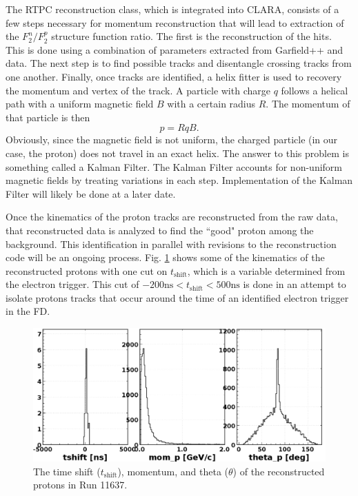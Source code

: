 The RTPC reconstruction class, which is integrated into CLARA, consists of a few steps necessary for momentum reconstruction that will lead to extraction of the $F_2^n/F_2^p$ structure function ratio. The first is the reconstruction of the hits. This is done using a combination of parameters extracted from Garfield++ and data. The next step is to find possible tracks and disentangle crossing tracks from one another. Finally, once tracks are identified, a helix fitter is used to recovery the momentum and vertex of the track. A particle with charge $q$ follows a helical path with a uniform magnetic field $B$ with a certain radius $R$. The momentum of that particle is then
\begin{equation}
p = RqB.
\end{equation}
Obviously, since the magnetic field is not uniform, the charged particle (in our case, the proton) does not travel in an exact helix. The answer to this problem is something called a Kalman Filter. The Kalman Filter accounts for non-uniform magnetic fields by treating variations in each step. Implementation of the Kalman Filter will likely be done at a later date.

Once the kinematics of the proton tracks are reconstructed from the raw data, that reconstructed data is analyzed to find the ``good" proton among the background. This identification in parallel with revisions to the reconstruction code will be an ongoing process. Fig. \ref{fig:rgf_pkin} shows some of the kinematics of the reconstructed protons with one cut on $t_{\mathrm{shift}}$, which is a variable determined from the electron trigger. This cut of $-200 \mathrm{ns} < t_{\mathrm{shift}} < 500 \mathrm{ns}$ is done in an attempt to isolate protons tracks that occur around the time of an identified electron trigger in the FD.

\begin{figure}[h!]
	\centering
	\includegraphics[width=0.9\linewidth]{figures/rgf/11637/pkinematics.png}
	\caption{The time shift ($t_{\mathrm{shift}}$), momentum, and theta ($\theta$) of the reconstructed protons in Run 11637.}
	\label{fig:rgf_pkin}
\end{figure}

